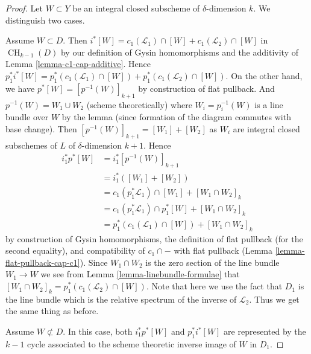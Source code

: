 \documentclass[10pt,a4paper]{amsart}
\theoremstyle{plain}
\theoremstyle{definition}
\theoremstyle{remark}
\numberwithin{equation}{subsection}
\def\CH{\mathop{\mathrm{CH}}\nolimits}
\begin{document}
\begin{proof}
Let $W \subset Y$ be an integral closed subscheme of $\delta$-dimension $k$.
We distinguish two cases.

\medskip\noindent
Assume $W \subset D$. Then
$i^*[W] = c_1(\mathcal{L}_1) \cap [W] + c_1(\mathcal{L}_2) \cap [W]$
in $\CH_{k - 1}(D)$ by our definition of Gysin homomorphisms and the
additivity of Lemma \ref{lemma-c1-cap-additive}.
Hence $p_1^*i^*[W] =
p_1^*(c_1(\mathcal{L}_1) \cap [W]) + p_1^*(c_1(\mathcal{L}_2) \cap [W])$.
On the other hand, we have
$p^*[W] = [p^{-1}(W)]_{k + 1}$ by construction of flat pullback.
And $p^{-1}(W) = W_1 \cup W_2$ (scheme theoretically)
where $W_i = p_i^{-1}(W)$ is a line bundle over $W$
by the lemma (since formation of the diagram commutes with base change).
Then $[p^{-1}(W)]_{k + 1} = [W_1] + [W_2]$ as $W_i$ are integral closed
subschemes of $L$ of $\delta$-dimension $k + 1$. Hence
\begin{align*}
i_1^*p^*[W]
& =
i_1^*[p^{-1}(W)]_{k + 1} \\
& =
i_1^*([W_1] + [W_2]) \\
& =
c_1(p_1^*\mathcal{L}_1) \cap [W_1] + [W_1 \cap W_2]_k \\
& =
c_1(p_1^*\mathcal{L}_1) \cap p_1^*[W] + [W_1 \cap W_2]_k \\
& =
p_1^*(c_1(\mathcal{L}_1) \cap [W]) + [W_1 \cap W_2]_k
\end{align*}
by construction of Gysin homomorphisms, the definition of flat pullback
(for the second equality), and compatibility of $c_1 \cap -$
with flat pullback (Lemma \ref{lemma-flat-pullback-cap-c1}).
Since $W_1 \cap W_2$ is the zero section of the line bundle
$W_1 \to W$ we see from Lemma \ref{lemma-linebundle-formulae}
that $[W_1 \cap W_2]_k = p_1^*(c_1(\mathcal{L}_2) \cap [W])$.
Note that here we use the fact that $D_1$ is the line bundle
which is the relative spectrum of the inverse of $\mathcal{L}_2$.
Thus we get the same thing as before.

\medskip\noindent
Assume $W \not \subset D$. In this case, both $i_1^*p^*[W]$
and $p_1^*i^*[W]$ are represented by the $k - 1$ cycle associated
to the scheme theoretic inverse image of $W$ in $D_1$.
\end{proof}
\end{document}
